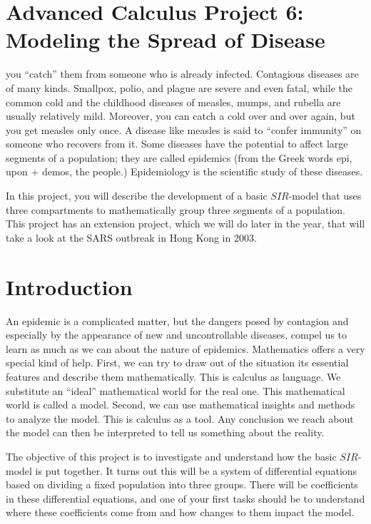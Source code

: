 \documentclass
[justified,nohyper]
{tufte-handout}
\begin{document}
\section{Advanced Calculus Project 6: Modeling the Spread of Disease}

 you ``catch'' them from someone 
who is already infected. Contagious diseases are of many kinds. Smallpox, polio, 
and plague are severe and even fatal, while the common cold and the childhood 
diseases of measles, mumps, and rubella are usually relatively mild. Moreover, you 
can catch a cold over and over again, but you get measles only once. A disease 
like measles is said to ``confer immunity'' on someone who recovers from it. Some 
diseases have the potential to affect large segments of a population; they are 
called epidemics (from the Greek words epi, upon + demos, the people.) 
Epidemiology is the scientific study of these diseases.

In this project, you will describe the development of a basic $SIR$-model that
uses three compartments to mathematically group three segments of a population.
This project has an extension project, which we will do later in the year, that
will take a look at the SARS outbreak in Hong Kong in 2003.

\section{Introduction}

An epidemic is a complicated matter, but the dangers posed by contagion and 
especially by the appearance of new and uncontrollable diseases, compel us to 
learn as much as we can about the nature of epidemics. Mathematics offers a very 
special kind of help. First, we can try to draw out of the situation its 
essential features and describe them mathematically. This is calculus as 
language. We substitute an ``ideal'' mathematical world for the real one. This 
mathematical world is called a model. Second, we can use mathematical insights 
and methods to analyze the model. This is calculus as a tool. Any conclusion we 
reach about the model can then be interpreted to tell us something about the 
reality.

The objective of this project is to investigate and understand how the basic 
$SIR$-model is put together. It turns out this will be a system of differential 
equations based on dividing a fixed population into three groups. There will be 
coefficients in these differential equations, and one of your first tasks should 
be to understand where these coefficients come from and how changes to them 
impact the model.
\end{document}
